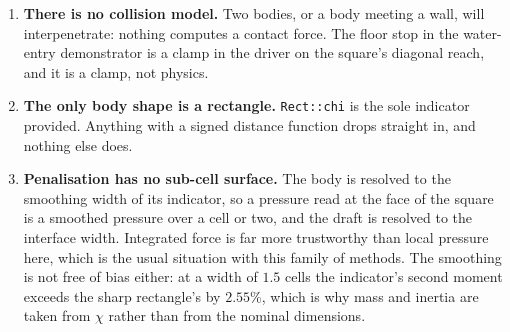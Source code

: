 \documentclass[11pt,a4paper]{article}
\newcommand{\code}[1]{\texttt{\small #1}}
\begin{document}
\begin{enumerate}[leftmargin=1.4em,itemsep=4pt]
\item \textbf{There is no collision model.} Two bodies, or a body meeting a
  wall, will interpenetrate: nothing computes a contact force. The floor stop in
  the water-entry demonstrator is a clamp in the driver on the square's diagonal
  reach, and it is a clamp, not physics.

\item \textbf{The only body shape is a rectangle.} \code{Rect::chi} is the sole
  indicator provided. Anything with a signed distance function drops straight
  in, and nothing else does.

\item \textbf{Penalisation has no sub-cell surface.} The body is resolved to the
  smoothing width of its indicator, so a pressure read at the face of the square
  is a smoothed pressure over a cell or two, and the draft is resolved to the
  interface width. Integrated force is far more trustworthy than local pressure
  here, which is the usual situation with this family of methods. The smoothing
  is not free of bias either: at a width of $1.5$ cells the indicator's second
  moment exceeds the sharp rectangle's by $2.55\%$, which is why mass and inertia
  are taken from $\chi$ rather than from the nominal dimensions.


\end{enumerate}
\end{document}

